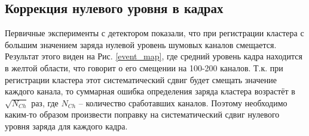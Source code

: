 \subsection{Коррекция нулевого уровня в кадрах}
\par Первичные эксперименты с детектором показали, что при регистрации кластера с большим значением заряда нулевой уровень шумовых каналов смещается. Результат этого виден на Рис. \ref{event_map}, где средний уровень кадра находится в желтой области, что говорит о его смещении на 100-200 каналов. Т.к. при регистрации кластера этот систематический сдвиг будет смещать значение каждого канала, то суммарная ошибка определения заряда кластера возрастёт в $\sqrt{N_{Ch}}$ раз, где $N_{Ch}$ -- количество сработавших каналов. Поэтому необходимо каким-то образом произвести поправку на систематический сдвиг нулевого уровня заряда для каждого кадра.
